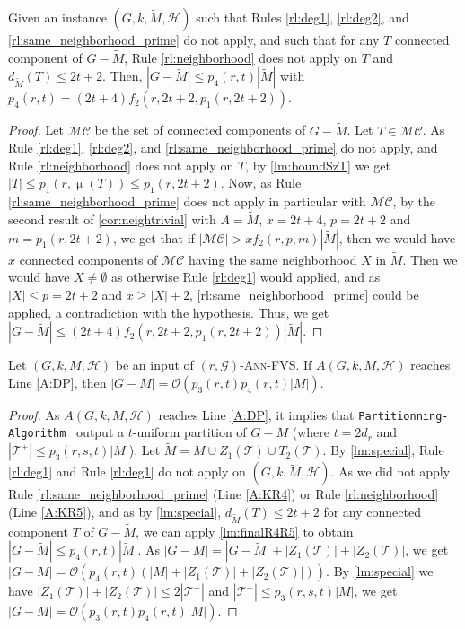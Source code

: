 \documentclass{amsart}
\newcommand{\algopart }{\texttt{Partitionning-Algorithm}~ }
\newcommand{\G}{\mathcal{G}}
\newcommand{\T}{\mathcal{T}}
\newcommand{\mC}{\mathcal{MC}}
\newcommand{\mT}{\mathcal{T}}
\newcommand{\mH}{\mathcal{H}}
\DeclareMathOperator\db{\mu}
\newcommand{\AFVS}{\textsc{$(r,\G)$-Ann-FVS}\xspace}
\newcommand{\ruleref}[1]{\hyperref[#1]{\ref*{#1}}}
\renewcommand{\O}{\mathcal{O}}
\begin{document}
\begin{lemma}\label{lm:finalR4R5}
    Given an instance $(G, k, \tilde{M}, \mH)$ such that Rules \ruleref{rl:deg1}, \ruleref{rl:deg2}, and \ruleref{rl:same_neighborhood_prime} do not apply, and such that for any $T$ connected component of $G-\tilde{M}$, Rule \ruleref{rl:neighborhood} does not apply on $T$ and $d_{\tilde{M}}(T)\leq 2t+2$. Then, $|G-\tilde{M}| \le p_4(r,t)|\tilde{M}|$ with $p_4(r,t)=(2t+4)f_2(r,2t+2,p_1(r,2t+2))$.
\end{lemma}
\begin{proof}
Let $\mC$ be the set of connected components of $G-\tilde{M}$. Let $T \in \mC$. As Rule \ruleref{rl:deg1}, \ruleref{rl:deg2}, and \ruleref{rl:same_neighborhood_prime} do not apply, and Rule \ruleref{rl:neighborhood} does not apply on $T$, by \autoref{lm:boundSzT} we get $|T| \le p_1(r,\db(T)) \le p_1(r,2t+2)$.  Now,  as Rule \ruleref{rl:same_neighborhood_prime} does not apply in particular with $\mC$, by the second result of \autoref{cor:neightrivial} with $A=\tilde{M}$, $x=2t+4$, $p=2t+2$ and $m=p_1(r,2t+2)$, we get that if $|\mC| > xf_2(r,p,m)|\tilde{M}|$, then we would have $x$ connected components of $\mC$ having the same neighborhood $X$ in $\tilde{M}$.
Then we would have $X\neq \emptyset$ as otherwise Rule \ruleref{rl:deg1} would applied, and as $|X| \le p=2t+2$ and $x \ge |X|+2$, \ruleref{rl:same_neighborhood_prime} could be applied, a contradiction with the hypothesis.
Thus, we get $|G-\tilde{M}| \le (2t+4)f_2(r,2t+2,p_1(r,2t+2))|\tilde{M}|$.
\end{proof}

\begin{lemma}\label{lm:sizeGMinusM}
Let $(G,k,M,\mH)$ be an input of \AFVS.
If $A(G,k,M,\mH)$ reaches Line \ref{A:DP}, 
then $|G-M|=\O(p_3(r,t)p_4(r,t)|M|)$.
\end{lemma}
\begin{proof}
As $A(G,k,M,\mH)$ reaches Line \ref{A:DP}, it implies that \algopart output a $t$-uniform partition of $G-M$ (where $t=2d_r$ and $|\mT^+| \le p_3(r,s,t)|M|$).
Let $\tilde{M}=M \cup Z_1(\T) \cup T_2(\T)$.
By \autoref{lm:special}, Rule \ruleref{rl:deg1} and Rule \ruleref{rl:deg1} do not apply on $(G,k,\tilde{M},\mH)$.
As we did not apply Rule \ruleref{rl:same_neighborhood_prime} (Line \ref{A:KR4}) or Rule \ruleref{rl:neighborhood} (Line \ref{A:KR5}), and as by \autoref{lm:special}, $d_{\tilde{M}}(T) \le 2t+2$ for any connected component $T$ of $G-\tilde{M}$, we can apply \autoref{lm:finalR4R5} to obtain
$|G-\tilde{M}| \le p_4(r,t)|\tilde{M}|$.
As $|G-M|=|G-\tilde{M}|+|Z_1(\T)|+|Z_2(\T)|$, we get
$|G-M|=\O\left(p_4(r,t)(|M|+|Z_1(\T)|+|Z_2(\T)|)\right)$.
By \autoref{lm:special} we have $|Z_1(\T)|+|Z_2(\T)| \le 2|\mT^+|$ and $|\mT^+| \le p_3(r,s,t)|M|$, we get
$|G-M|=\O(p_3(r,t)p_4(r,t)|M|)$.
\end{proof}
\end{document}
